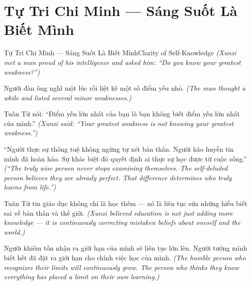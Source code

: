 \section{Tự Tri Chi Minh — Sáng Suốt Là Biết Mình}
\begin{truyen}{Tự Tri Chi Minh — Sáng Suốt Là Biết Mình}{Clarity of Self-Knowledge}
\textit{(Xunzi met a man proud of his intelligence and asked him: ``Do you know your greatest weakness?'')}

Người đàn ông nghĩ một lúc rồi liệt kê một số điểm yếu nhỏ.
\textit{(The man thought a while and listed several minor weaknesses.)}

Tuân Tử nói: ``Điểm yếu lớn nhất của bạn là bạn không biết điểm yếu lớn nhất của mình.''
\textit{(Xunzi said: ``Your greatest weakness is not knowing your greatest weakness.'')}

``Người thực sự thông tuệ không ngừng tự xét bản thân. Người hão huyền tin mình đã hoàn hảo. Sự khác biệt đó quyết định ai thực sự học được từ cuộc sống.''
\textit{(``The truly wise person never stops examining themselves. The self-deluded person believes they are already perfect. That difference determines who truly learns from life.'')}

Tuân Tử tin giáo dục không chỉ là học thêm — nó là liên tục sửa những hiểu biết sai về bản thân và thế giới.
\textit{(Xunzi believed education is not just adding more knowledge — it is continuously correcting mistaken beliefs about oneself and the world.)}

\end{truyen}

\begin{baihoc}
Người khiêm tốn nhận ra giới hạn của mình sẽ liên tục lớn lên. Người tưởng mình biết hết đã đặt ra giới hạn cho chính việc học của mình.
\textit{(The humble person who recognizes their limits will continuously grow. The person who thinks they know everything has placed a limit on their own learning.)}
\end{baihoc}
\ngancach

